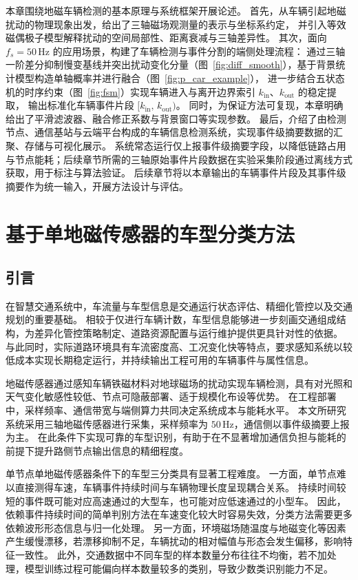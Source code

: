 \documentclass{xdupgthesis}
\newcommand{\Fs}{\ensuremath{50\,\mathrm{Hz}}}
\begin{document}
本章围绕地磁车辆检测的基本原理与系统框架开展论述。
首先，从车辆引起地磁扰动的物理现象出发，给出了三轴磁场观测量的表示与坐标系约定，
并引入等效磁偶极子模型解释扰动的空间局部性、距离衰减与三轴差异性。
其次，面向 $f_s = \Fs$ 的应用场景，构建了车辆检测与事件分割的端侧处理流程：
通过三轴一阶差分抑制慢变基线并突出扰动变化分量（图~\ref{fig:diff_smooth}），基于背景统计模型构造单轴概率并进行融合（图~\ref{fig:p_car_example}），
进一步结合五状态机的时序约束（图~\ref{fig:fsm}）实现车辆进入与离开边界索引 $k_{\mathrm{in}}$、$k_{\mathrm{out}}$ 的稳定提取，
输出标准化车辆事件片段 $[k_{\mathrm{in}},\,k_{\mathrm{out}})$。
同时，为保证方法可复现，本章明确给出了平滑滤波器、融合修正系数与背景窗口等实现参数。
最后，介绍了由检测节点、通信基站与云端平台构成的车辆信息检测系统，实现事件级摘要数据的汇聚、存储与可视化展示。
系统常态运行仅上报事件级摘要字段，以降低链路占用与节点能耗；后续章节所需的三轴原始事件片段数据在实验采集阶段通过离线方式获取，用于标注与算法验证。
后续章节将以本章输出的车辆事件片段及其事件级摘要作为统一输入，开展方法设计与评估。








\chapter{基于单地磁传感器的车型分类方法}


\section{引言}

在智慧交通系统中，车流量与车型信息是交通运行状态评估、精细化管控以及交通规划的重要基础。
相较于仅进行车辆计数，车型信息能够进一步刻画交通组成结构，为差异化管控策略制定、道路资源配置与运行维护提供更具针对性的依据。
与此同时，实际道路环境具有车流密度高、工况变化快等特点，要求感知系统以较低成本实现长期稳定运行，并持续输出工程可用的车辆事件与属性信息。

地磁传感器通过感知车辆铁磁材料对地球磁场的扰动实现车辆检测，具有对光照和天气变化敏感性较低、节点可隐蔽部署、适于规模化布设等优势。
在工程部署中，采样频率、通信带宽与端侧算力共同决定系统成本与能耗水平。
本文所研究系统采用三轴地磁传感器进行采集，采样频率为 $50\,\mathrm{Hz}$，通信侧以事件级摘要上报为主。
在此条件下实现可靠的车型识别，有助于在不显著增加通信负担与能耗的前提下提升路侧节点输出信息的精细程度。

单节点单地磁传感器条件下的车型三分类具有显著工程难度。
一方面，单节点难以直接测得车速，车辆事件持续时间与车辆物理长度呈现耦合关系。
持续时间较短的事件既可能对应高速通过的大型车，也可能对应低速通过的小型车。
因此，依赖事件持续时间的简单判别方法在车速变化较大时容易失效，分类方法需要更多依赖波形形态信息与归一化处理。
另一方面，环境磁场随温度与地磁变化等因素产生缓慢漂移，若漂移抑制不足，车辆扰动的相对幅值与形态会发生偏移，影响特征一致性。
此外，交通数据中不同车型的样本数量分布往往不均衡，若不加处理，模型训练过程可能偏向样本数量较多的类别，导致少数类识别能力不足。
\end{document}
